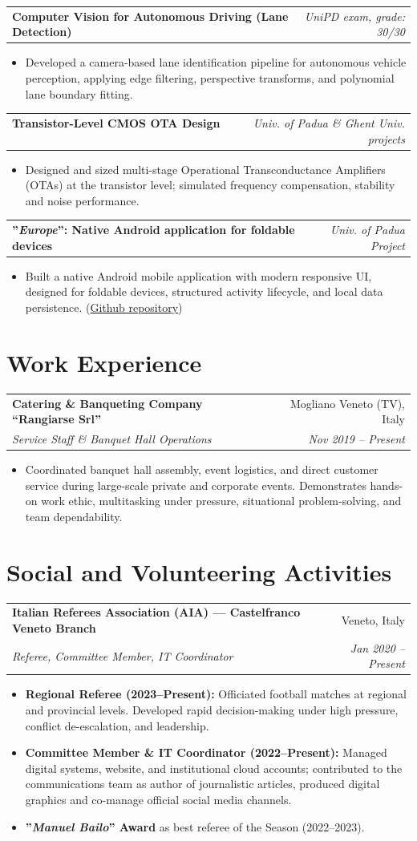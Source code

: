 \documentclass[10pt,a4paper]{article}
\makeatletter
\newcommand{\resumeItem}[1]{%
  \item\small{#1}%
}
\newcommand{\resumeSubheading}[4]{%
  \vspace{0.5pt}
  \noindent\begin{tabular*}{\textwidth}[t]{@{}l@{\extracolsep{\fill}}r@{}}
    \textbf{#1} & \textcolor{secondary}{\small #2} \\
    \textit{\small #3} & \textcolor{secondary}{\textit{\small #4}} \\
  \end{tabular*}\vspace{-2pt}
}
\newcommand{\resumeProjectHeading}[2]{%
  \vspace{0.5pt}
  \noindent\begin{tabular*}{\textwidth}[t]{@{}l@{\extracolsep{\fill}}r@{}}
    \textbf{#1} & \textcolor{secondary}{\textit{\small #2}} \\
  \end{tabular*}\vspace{-2pt}
}
\newcommand{\resumeItemListStart}{\begin{itemize}[leftmargin=1.15em, itemsep=2.2pt, topsep=0.5pt, parsep=0pt]}
\newcommand{\resumeItemListEnd}{\end{itemize}\vspace{0pt}}
\makeatother
\begin{document}
\resumeProjectHeading
  {\textbf{Computer Vision for Autonomous Driving (Lane Detection)} \ \textbar\ \ \normalfont{\textit{Python, OpenCV, Image Processing}}}{UniPD exam, grade: 30/30}
  \resumeItemListStart
    \resumeItem{Developed a camera-based lane identification pipeline for autonomous vehicle perception, applying edge filtering, perspective transforms, and polynomial lane boundary fitting.}
  \resumeItemListEnd

\resumeProjectHeading
  {\textbf{Transistor-Level CMOS OTA Design} \ \textbar\ \ \normalfont{\textit{Cadence Virtuoso, SPICE}}}{Univ. of Padua \& Ghent Univ. projects}
  \resumeItemListStart
    \resumeItem{Designed and sized multi-stage Operational Transconductance Amplifiers (OTAs) at the transistor level; simulated frequency compensation, stability and noise performance.}
  \resumeItemListEnd

\resumeProjectHeading
  {\textbf{''\textit{Europe}'': Native Android application for foldable devices} \ \textbar\ \ \normalfont{\textit{Kotlin, Android Studio}}}{Univ. of Padua Project}
  \resumeItemListStart
    \resumeItem{Built a native Android mobile application with modern responsive UI, designed for foldable devices, structured activity lifecycle, and local data persistence. (\href{https://github.com/giacomoazzari/Europe}{Github repository})}
  \resumeItemListEnd

\section{Work Experience}

\resumeSubheading
  {Catering \& Banqueting Company ``Rangiarse Srl''}{Mogliano Veneto (TV), Italy}
  {Service Staff \& Banquet Hall Operations}{Nov 2019 -- Present}
  \resumeItemListStart
    \resumeItem{Coordinated banquet hall assembly, event logistics, and direct customer service during large-scale private and corporate events. Demonstrates hands-on work ethic, multitasking under pressure, situational problem-solving, and team dependability.}
  \resumeItemListEnd

\section{Social and Volunteering Activities}

\resumeSubheading
  {Italian Referees Association (AIA) --- Castelfranco Veneto Branch}{Veneto, Italy}
  {Referee, Committee Member, IT Coordinator}{Jan 2020 -- Present}
  \resumeItemListStart
  	\resumeItem{\textbf{Regional Referee (2023--Present):} Officiated football matches at regional and provincial levels. Developed rapid decision-making under high pressure, conflict de-escalation, and leadership.}
    \resumeItem{\textbf{Committee Member \& IT Coordinator  (2022--Present):} Managed digital systems, website, and institutional cloud accounts; contributed to the communications team as author of journalistic articles, produced digital graphics and co-manage official social media channels.}
    \resumeItem{\textbf{''\textit{Manuel Bailo}'' Award} as best referee of the Season (2022--2023).}
  \resumeItemListEnd
\end{document}

